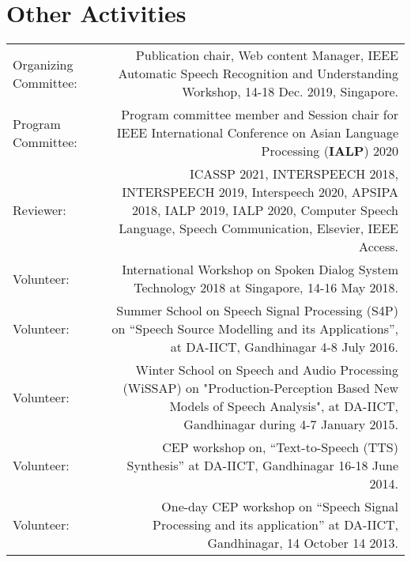 \documentclass[10pt]{article}
\begin{document}
\section*{Other Activities}
\begin{tabular}{L!{\VRule}R}
Organizing Committee: & Publication chair, Web content Manager, IEEE Automatic Speech Recognition and Understanding Workshop, 14-18 Dec. 2019, Singapore.\vspace{0.1cm}\\
Program Committee: & Program committee member and  Session chair for IEEE International Conference on Asian Language Processing  (\textbf{IALP}) 2020\vspace{0.1cm}\\ 
Reviewer: & ICASSP 2021, INTERSPEECH 2018, INTERSPEECH 2019, Interspeech 2020, APSIPA 2018, IALP 2019, IALP 2020, Computer Speech Language, Speech Communication, Elsevier, IEEE Access.\vspace{0.1cm}\\
Volunteer:&International Workshop on Spoken Dialog System Technology 2018 at Singapore, 14-16 May 2018.\vspace{0.1cm}\\
Volunteer:&Summer School on Speech Signal Processing (S4P) on ``Speech Source Modelling and its Applications'', at {DA-IICT, Gandhinagar} 4-8 July 2016.\vspace{0.1cm}\\
Volunteer:& Winter School on Speech and Audio Processing (WiSSAP) on "Production-Perception Based New Models of Speech Analysis", at DA-IICT, Gandhinagar during 4-7 January 2015.\vspace{0.1cm}\\
Volunteer: & CEP workshop on, ``Text-to-Speech (TTS) Synthesis'' at DA-IICT, Gandhinagar 16-18 June 2014.\vspace{0.1cm}\\
Volunteer:& One-day CEP workshop on ``Speech Signal Processing and its application'' at {DA-IICT, Gandhinagar}, 14 October 14 2013.
\end{tabular}
\end{document}
